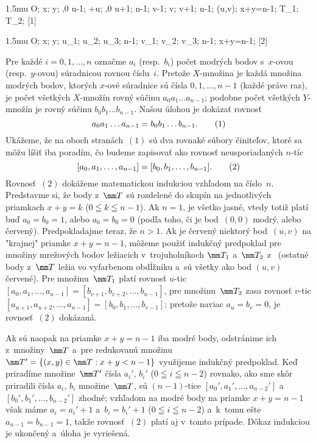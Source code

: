 {%
\fontplace
\medmuskip 1.5mu%
\rtpoint O; \tpoint x; \rpoint y;
\tpoint{},0 u-1; \tpoint\vphantom+u; \tpoint{},0 u+1;
\tpoint n-1;
\rpoint v-1; \rpoint v; \rpoint v+1; \rpoint n-1;
\lBpoint(u,v); \lBpoint x+y=n-1;
\cpoint\mm T_1; \cpoint\mm T_2;
[1] \hfil\Obr

\fontplace
\medmuskip 1.5mu%
\rtpoint O; \tpoint x; \rpoint y;
\tpoint u_1; \tpoint u_2; \tpoint u_3; \tpoint n-1;
\rpoint v_1; \rpoint v_2; \rpoint v_3; \rpoint n-1;
\lBpoint x+y=n-1;
[2] \hfil\Obr

Pre každé $i=0,1,\dots,n$ označme $a_i$ (resp.~$b_i$)
počet modrých bodov s~\hbox{$x$-ovou} (resp.~$y$-ovou) súradnicou rovnou
číslu~$i$. Pretože $X$-množina je každá množina modrých bodov,
ktorých $x$-ové súradnice sú čísla $0,1,\dots,n-1$
(každé práve raz), je počet všetkých $X$-množín rovný súčinu
$a_0a_1\dots a_{n-1}$;
podobne počet všetkých $Y$-množín je rovný súčinu $b_0b_1\dots b_{n-1}$.
Našou úlohou je dokázať rovnosť
$$
a_0a_1\dots a_{n-1}=b_0b_1\dots b_{n-1}.
\tag1
$$
Ukážeme, že na oboch stranách~$(1)$ sú dva rovnaké súbory
činiteľov, ktoré sa môžu líšiť iba poradím, čo budeme zapisovať
ako rovnosť neusporiadaných $n$-tíc
$$
[a_0,a_1,\dots,a_{n-1}]=[b_0,b_1,\dots,b_{n-1}].
\tag2
$$
Rovnosť~$(2)$ dokážeme matematickou indukciou vzhľadom na číslo~$n$.
Predstavme si, že body z~$\mm T$ sú rozdelené do skupín na
jednotlivých priamkach $x+y=k$ ($0\leqq k\leqq n-1$). Ak $n=1$,
je všetko jasné, vtedy totiž platí buď $a_0=b_0=1$, alebo $a_0=b_0=0$
(podľa toho, či je bod~$(0,0)$ modrý, alebo červený).
Predpokladajme teraz, že $n>1$. Ak je červený niektorý bod~$(u,v)$
na "krajnej" priamke $x+y=n-1$, môžeme použiť indukčný predpoklad
pre množiny mrežových bodov ležiacich v~trojuholníkoch $\mm T_1$
a~$\mm T_2$ z~\obr{} (ostatné body z~$\mm T$ ležia vo vyfarbenom
obdĺžniku
a~sú všetky ako bod
$(u,v)$ červené). Pre množinu~$\mm T_1$ platí rovnosť $u$-tic
$[a_0,a_1,\dots,a_{u-1}]=[b_{v+1},b_{v+2},\dots,b_{n-1}]$, pre
množinu~$\mm T_2$ zasa rovnosť $v$-tic
$[a_{u+1},a_{u+2},\dots,a_{n-1}]=[b_{0},b_{1},\dots,b_{v-1}]$;
pretože naviac $a_u=b_v=0$, je rovnosť~$(2)$ dokázaná.

\midinsert
\inspicture{}
\endinsert

Ak sú naopak na priamke $x+y=n-1$ iba modré body, odstránime
ich z~množiny~$\mm T$ a~pre redukovanú množinu $\mm
T'=\{(x,y)\in\mm T: x+y<{n-1}\}$ využijeme indukčný predpoklad.
Keď priradíme množine~$\mm T'$ čísla $a_i'$, $b_i'$ ($0\leqq
i\leqq n-2$) rovnako, ako sme skôr priradili čísla $a_i$, $b_i$
množine~$\mm T$, sú $(n-1)$-tice $[a_0',a_1',\dots,a_{n-2}']$
a~$[b_0',b_1',\dots,b_{n-2}']$ zhodné; vzhľadom na modré body na
priamke $x+y=n-1$ však máme $a_i=a_i'+1$ a~$b_i=b_i'+1$ ($0\leqq
i\leqq n-2$) a~k~tomu ešte $a_{n-1}=b_{n-1}=1$, takže rovnosť~$(2)$
platí aj v~tomto prípade. Dôkaz indukciou je ukončený a~úloha je
vyriešená.

}
